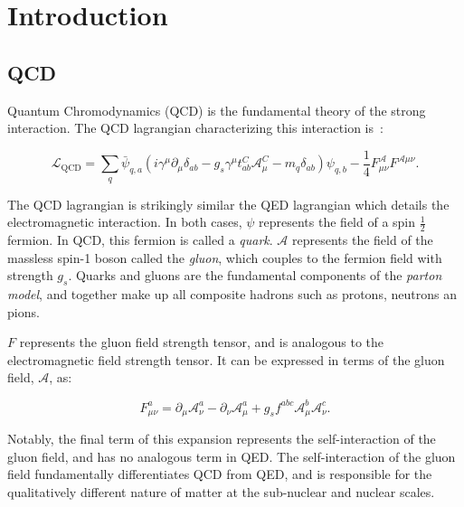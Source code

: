 





\chapter{Introduction}

\section{QCD}
\label{sec:QCD}
Quantum Chromodynamics (QCD) is the fundamental theory of the strong interaction. The QCD lagrangian characterizing this interaction is~\cite{and2010}:


\begin{equation}
  \mathcal{L}_\mathrm{QCD} = \sum_q \bar{\psi}_{q,a}\left(i\gamma^\mu\partial_\mu \delta_{ab} -g_s\gamma^\mu t^{C}_{ab} \mathcal{A}_\mu^C - m_q\delta_{ab}\right) \psi_{q,b} - \frac{1}{4}F^\mathcal{A}_{\mu\nu}F^{\mathcal{A}\mu\nu}.
\label{eq:qcd_lagrangian}
\end{equation} 

The QCD lagrangian is strikingly similar the QED lagrangian which details the electromagnetic interaction. In both cases, $\psi$ represents the field of a spin $\frac{1}{2}$ fermion. In QCD, this fermion is called a \textit{quark}. $\mathcal{A}$ represents the field of the massless spin-1 boson called the \textit{gluon}, which couples to the fermion field with strength $g_s$. Quarks and gluons are the fundamental components of the \textit{parton model}, and together make up all composite hadrons such as protons, neutrons an pions.

$F$ represents the gluon field strength tensor, and is analogous to the electromagnetic field strength tensor. It can be expressed in terms of the gluon field, $\mathcal{A}$, as:

\begin{equation}
  F^a_{\mu \nu} = \partial_\mu \mathcal{A}^a_\nu - \partial_\nu \mathcal{A}^a_\mu + g_s f^{abc} \mathcal{A}^b_\mu \mathcal{A}^c_\nu.
\label{eq: gluon_tensor}
\end{equation}

Notably, the final term of this expansion represents the self-interaction of the gluon field, and has no analogous term in QED. The self-interaction of the gluon field fundamentally differentiates QCD from QED, and is responsible for the qualitatively different nature of matter at the sub-nuclear and nuclear scales.

